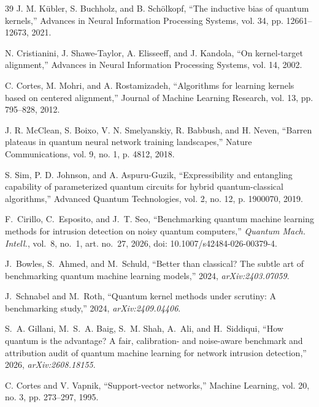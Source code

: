 \begin{thebibliography}{39}
J. M. K\"ubler, S. Buchholz, and B. Sch\"olkopf, ``The inductive bias of quantum kernels,'' Advances in Neural Information Processing Systems, vol. 34, pp. 12661--12673, 2021.

N. Cristianini, J. Shawe-Taylor, A. Elisseeff, and J. Kandola, ``On kernel-target alignment,'' Advances in Neural Information Processing Systems, vol. 14, 2002.

C. Cortes, M. Mohri, and A. Rostamizadeh, ``Algorithms for learning kernels based on centered alignment,'' Journal of Machine Learning Research, vol. 13, pp. 795--828, 2012.

J. R. McClean, S. Boixo, V. N. Smelyanskiy, R. Babbush, and H. Neven, ``Barren plateaus in quantum neural network training landscapes,'' Nature Communications, vol. 9, no. 1, p. 4812, 2018.

S. Sim, P. D. Johnson, and A. Aspuru-Guzik, ``Expressibility and entangling capability of parameterized quantum circuits for hybrid quantum-classical algorithms,'' Advanced Quantum Technologies, vol. 2, no. 12, p. 1900070, 2019.

F.~Cirillo, C.~Esposito, and J.~T. Seo, ``Benchmarking quantum machine
learning methods for intrusion detection on noisy quantum computers,''
\emph{Quantum Mach. Intell.}, vol.~8, no.~1, art. no.~27, 2026,
doi: 10.1007/s42484-026-00379-4.

J.~Bowles, S.~Ahmed, and M.~Schuld, ``Better than classical? The subtle art of
benchmarking quantum machine learning models,'' 2024, \emph{arXiv:2403.07059}.

J.~Schnabel and M.~Roth, ``Quantum kernel methods under scrutiny: A benchmarking
study,'' 2024, \emph{arXiv:2409.04406}.

S.~A. Gillani, M.~S.~A. Baig, S.~M. Shah, A.~Ali, and H.~Siddiqui, ``How quantum
is the advantage? A fair, calibration- and noise-aware benchmark and attribution
audit of quantum machine learning for network intrusion detection,'' 2026,
\emph{arXiv:2608.18155}.

C. Cortes and V. Vapnik, ``Support-vector networks,'' Machine Learning, vol. 20, no. 3, pp. 273--297, 1995.


\end{thebibliography}
